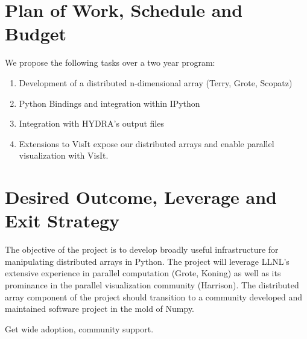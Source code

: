 \documentclass[a4paper]{article}
\begin{document}


\section*{Plan of Work, Schedule and Budget}

We propose the following tasks over a two year program:

\begin{enumerate}
	\item Development of a distributed n-dimensional array (Terry, Grote, Scopatz)

	\item Python Bindings and integration within IPython

	\item Integration with HYDRA's output files

	\item Extensions to VisIt expose our distributed arrays and enable parallel visualization with VisIt.
\end{enumerate}


\section*{Desired Outcome, Leverage and Exit Strategy}

The objective of the project is to develop broadly useful infrastructure for manipulating distributed arrays in Python.  The project will leverage LLNL's extensive experience in parallel computation (Grote, Koning) as well as its prominance in the parallel visualization community (Harrison).   The distributed array component of the project should transition to a community developed and maintained software project in the mold of Numpy.

Get wide adoption, community support.


\end{document}

